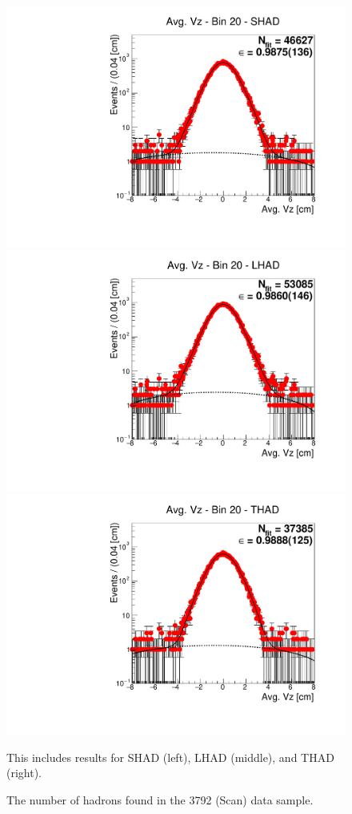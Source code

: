 \begin{figure}[H]
\centering
\includegraphics[scale=0.25]{figures/plots/nonDDbar_fit_results/scan/fit_scan_20_data_SHAD.pdf}
\hspace{-0.5cm}
\includegraphics[scale=0.25]{figures/plots/nonDDbar_fit_results/scan/fit_scan_20_data_LHAD.pdf}
\hspace{-0.5cm}
\includegraphics[scale=0.25]{figures/plots/nonDDbar_fit_results/scan/fit_scan_20_data_THAD.pdf}
\caption{The number of hadrons found in the 3792 (Scan) data sample.}
{This includes results for SHAD (left), LHAD (middle), and THAD (right).}
\label{fig:hadron_fits_scan_20}
\end{figure}

